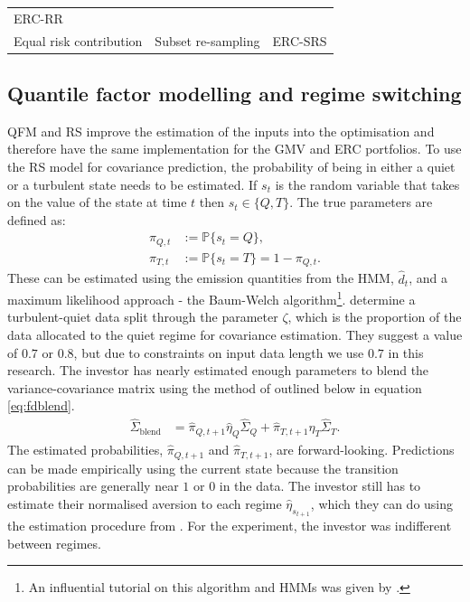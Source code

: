 \documentclass[
]{article}
\begin{document}
\begin{longtable}[]{@{}lll@{}}
\begin{minipage}[t]{0.14\columnwidth}
ERC-RR\strut
\end{minipage}\tabularnewline
\begin{minipage}[t]{0.27\columnwidth}\raggedright
Equal risk contribution\strut
\end{minipage} & \begin{minipage}[t]{0.50\columnwidth}\raggedright
Subset re-sampling\strut
\end{minipage} & \begin{minipage}[t]{0.14\columnwidth}\raggedright
ERC-SRS\strut
\end{minipage}\tabularnewline
\bottomrule
\end{longtable}

\hypertarget{quantile-factor-modelling-and-regime-switching}{%
\subsection{Quantile factor modelling and regime switching}\label{quantile-factor-modelling-and-regime-switching}}

QFM and RS improve the estimation of the inputs into the optimisation and therefore have the same
implementation for the GMV and ERC portfolios. To use the RS model for covariance prediction, the
probability of being in either a quiet or a turbulent state needs to be estimated. If \(s_t\) is the
random variable that takes on the value of the state at time \(t\) then \(s_t \in \{Q, T\}\). The true
parameters are defined as:
\begin{align*}
\pi_{Q, t} &:= \mathbb{P}\{s_t = Q\}, \\
\pi_{T, t} &:= \mathbb{P}\{s_t = T\} = 1 - \pi_{Q, t}.
\end{align*}
These can be estimated using the emission quantities from the HMM, \(\hat{d}_t\), and a maximum
likelihood approach - the Baum-Welch algorithm\footnote{An influential tutorial on this algorithm and
  HMMs was given by \citet{R89}.}. \citet{K12} determine a turbulent-quiet data split through the parameter \(\zeta\),
which is the proportion of the data allocated to the quiet regime for covariance estimation. They
suggest a value of \(0.7\) or \(0.8\), but due to constraints on input data length we use \(0.7\) in this
research. The investor has nearly estimated enough parameters to blend the variance-covariance matrix
using the method of \citet{FD18} outlined below in equation \eqref{eq:fdblend}.
\begin{align}
\hat{\Sigma}_{\text{blend}} & = \hat{\pi}_{Q, t + 1} \hat{\eta}_Q \hat{\Sigma}_Q + \hat{\pi}_{T, t + 1} \hat{\eta}_T \hat{\Sigma}_T. \label{eq:fdblend}
\end{align}
The estimated probabilities, \(\hat{\pi}_{Q, t + 1}\) and \(\hat{\pi}_{T, t + 1}\), are forward-looking.
Predictions can be made empirically using the current state because the transition probabilities are
generally near \(1\) or \(0\) in the data. The investor still has to estimate their normalised aversion to
each regime \(\hat{\eta}_{s_{t+1}}\), which they can do using the estimation procedure from \citet{B18}. For
the experiment, the investor was indifferent between regimes.
\end{document}
